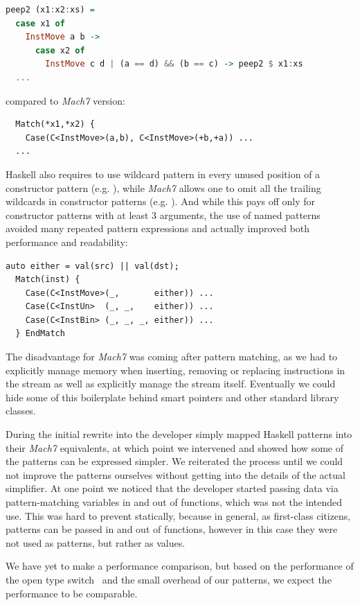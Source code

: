 \begin{lstlisting}[language=Haskell]
peep2 (x1:x2:xs) = 
  case x1 of
    InstMove a b -> 
      case x2 of
        InstMove c d | (a == d) && (b == c) -> peep2 $ x1:xs
  ...
\end{lstlisting}

\noindent compared to \emph{Mach7} version:

\begin{lstlisting}
  Match(*x1,*x2) {
    Case(C<InstMove>(a,b), C<InstMove>(+b,+a)) ...
  ...
\end{lstlisting}

\noindent
Haskell also requires to use wildcard pattern in every unused position of a 
constructor pattern (e.g. ), while \emph{Mach7} 
allows one to omit all the trailing wildcards in constructor patterns (e.g. 
). And while this pays off only for constructor patterns with 
at least 3 arguments, the use of named patterns avoided many repeated pattern 
expressions and actually improved both performance and readability:

\begin{lstlisting}[columns=flexible]
  auto either = val(src) || val(dst);
  Match(inst) {
    Case(C<InstMove>(_,       either)) ...
    Case(C<InstUn>  (_, _,    either)) ...
    Case(C<InstBin> (_, _, _, either)) ...
  } EndMatch
\end{lstlisting}

\noindent
The disadvantage for \emph{Mach7} was coming after pattern matching, as we had to 
explicitly manage memory when inserting, removing or replacing instructions in 
the stream as well as explicitly manage the stream itself. Eventually we could 
hide some of this boilerplate behind smart pointers and other standard library 
classes.

During the initial rewrite into \Cpp{} the developer simply mapped Haskell 
patterns into their \emph{Mach7} equivalents, at which point we intervened and 
showed how some of the patterns can be expressed simpler. We reiterated the 
process until we could not improve the patterns ourselves without getting into 
the details of the actual simplifier. At one point we noticed that the developer 
started passing data via pattern-matching variables  in and out of 
functions, which was not the intended use. This was hard to prevent statically, 
because in general, as first-class citizens, patterns can be passed in and out 
of functions, however in this case they were not used as patterns, but rather as 
values.

We have yet to make a performance comparison, but based on the performance of 
the open type switch~\cite{TS12} and the small overhead of our patterns, we 
expect the performance to be comparable.